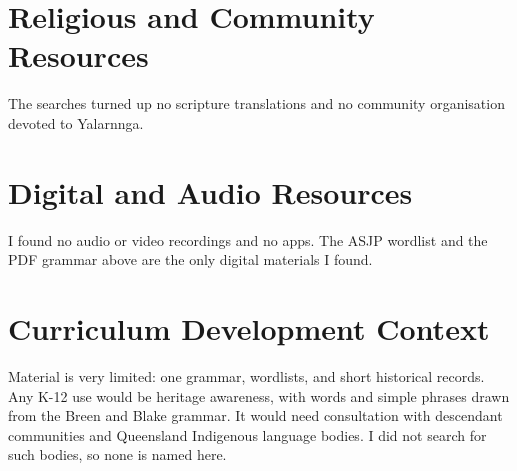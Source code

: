 \documentclass[12pt]{article}
\begin{document}
\section{Religious and Community Resources}
The searches turned up no scripture translations and no community organisation devoted to Yalarnnga.

\section{Digital and Audio Resources}
I found no audio or video recordings and no apps. The ASJP wordlist and the PDF grammar above are the only digital materials I found.

\section{Curriculum Development Context}
Material is very limited: one grammar, wordlists, and short historical records. Any K-12 use would be heritage awareness, with words and simple phrases drawn from the Breen and Blake grammar. It would need consultation with descendant communities and Queensland Indigenous language bodies. I did not search for such bodies, so none is named here.
\end{document}
